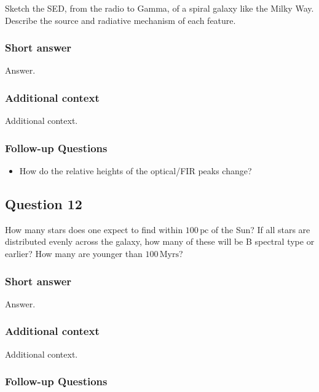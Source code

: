 \documentclass[a4paper,10pt]{article}
\begin{document}
Sketch the SED, from the radio to Gamma, of a spiral galaxy like the Milky Way. Describe the source and radiative mechanism of each feature.

\subsubsection{Short answer}

Answer.

\subsubsection{Additional context}

Additional context.

\subsubsection{Follow-up Questions}

\begin{itemize}
    \item How do the relative heights of the optical/FIR peaks change?
\end{itemize}


\newpage
\subsection{Question 12}

How many stars does one expect to find within $100\,\mathrm{pc}$ of the Sun? If all stars are distributed evenly across the galaxy, how many of these will be B spectral type or earlier? How many are younger than $100\,\mathrm{Myrs}$?

\subsubsection{Short answer}

Answer.

\subsubsection{Additional context}

Additional context.

\subsubsection{Follow-up Questions}
\end{document}
